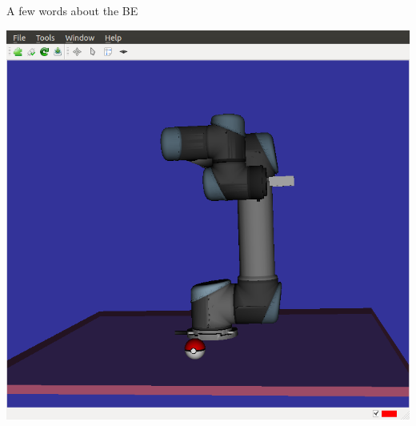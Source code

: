 %
%

\begin {frame} {A few words about the BE}
  \begin {center}
    \includegraphics [width=.5\linewidth] {figures/be.png}
  \end {center}
\end {frame}
